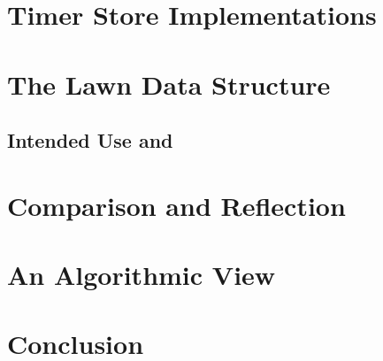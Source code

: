 \documentclass[twocolumn,a4paper]{article}
\begin{document}
\section{Timer Store Implementations}

\section{The Lawn Data Structure}

\subsection{Intended Use and }

\section{Comparison and Reflection}

\section{An Algorithmic View}

\section{Conclusion}



\end{document}
